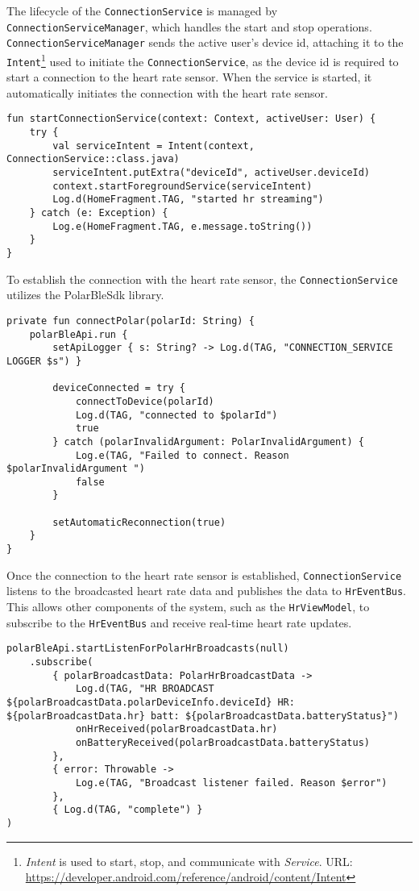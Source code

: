 The lifecycle of the \verb;ConnectionService; is managed by \verb;ConnectionServiceManager;, which handles the start and stop operations. 
\texttt{ConnectionServiceManager} sends the active user's device id, attaching it to the \texttt{Intent}\footnote{\emph{Intent} is used to start, stop, and communicate with \emph{Service}. URL: \url{https://developer.android.com/reference/android/content/Intent}} used to initiate the \texttt{ConnectionService},
as the device id is required to start a connection to the heart rate sensor.
When the service is started, it automatically initiates the connection with the heart rate sensor.
\begin{lstlisting}[caption={Function to start ConnectionService (Kotlin - ConnectionServiceManager)}]
fun startConnectionService(context: Context, activeUser: User) {
    try {
        val serviceIntent = Intent(context, ConnectionService::class.java)
        serviceIntent.putExtra("deviceId", activeUser.deviceId)
        context.startForegroundService(serviceIntent)
        Log.d(HomeFragment.TAG, "started hr streaming")
    } catch (e: Exception) {
        Log.e(HomeFragment.TAG, e.message.toString())
    }
}
\end{lstlisting}

To establish the connection with the heart rate sensor, the \verb;ConnectionService; utilizes the PolarBleSdk library.
\begin{lstlisting}[caption={Function to initiate connection to heart rate sensor (Kotlin - ConnectionService)}]
private fun connectPolar(polarId: String) {
    polarBleApi.run {
        setApiLogger { s: String? -> Log.d(TAG, "CONNECTION_SERVICE LOGGER $s") }

        deviceConnected = try {
            connectToDevice(polarId)
            Log.d(TAG, "connected to $polarId")
            true
        } catch (polarInvalidArgument: PolarInvalidArgument) {
            Log.e(TAG, "Failed to connect. Reason $polarInvalidArgument ")
            false
        }

        setAutomaticReconnection(true)
    }
}
\end{lstlisting}

Once the connection to the heart rate sensor is established, \verb;ConnectionService; listens to the broadcasted heart rate data and publishes the data to \verb;HrEventBus;.
This allows other components of the system, such as the \verb;HrViewModel;, to subscribe to the \verb;HrEventBus; and receive real-time heart rate updates. 
\begin{lstlisting}[caption={Heart rate data broadcast listener (Kotlin - ConnectionService)}]
polarBleApi.startListenForPolarHrBroadcasts(null)
    .subscribe(
        { polarBroadcastData: PolarHrBroadcastData ->
            Log.d(TAG, "HR BROADCAST ${polarBroadcastData.polarDeviceInfo.deviceId} HR: ${polarBroadcastData.hr} batt: ${polarBroadcastData.batteryStatus}")
            onHrReceived(polarBroadcastData.hr)
            onBatteryReceived(polarBroadcastData.batteryStatus)
        },
        { error: Throwable ->
            Log.e(TAG, "Broadcast listener failed. Reason $error")
        },
        { Log.d(TAG, "complete") }
)
\end{lstlisting}

